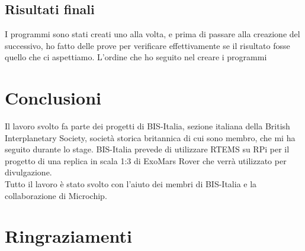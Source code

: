 \documentclass[12pt, a4paper, titlepage, oneside]{book}
\begin{document}
\begin{flushleft}
\section{Risultati finali}
I programmi sono stati creati uno alla volta, e prima di passare alla creazione del successivo, ho fatto delle prove per verificare effettivamente se il risultato fosse quello che ci aspettiamo.
L'ordine che ho seguito nel creare i programmi 
\chapter{Conclusioni}

Il lavoro svolto fa parte dei progetti di BIS-Italia, sezione italiana della British Interplanetary Society, società storica britannica di cui sono membro, che mi ha seguito durante lo stage. BIS-Italia prevede di utilizzare RTEMS su RPi per il progetto di una replica in scala 1:3 di ExoMars Rover che verrà utilizzato per divulgazione.\\
Tutto il lavoro è stato svolto con l'aiuto dei membri di BIS-Italia e la collaborazione di Microchip.
\chapter*{Ringraziamenti}
\printbibliography
\end{flushleft}
\end{document}
